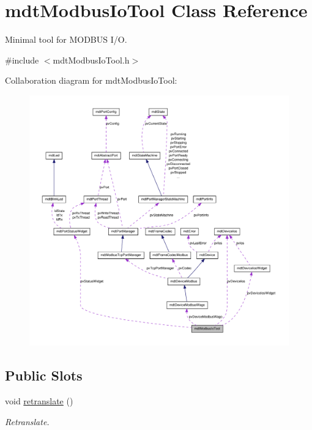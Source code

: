 \hypertarget{classmdt_modbus_io_tool}{
\section{mdtModbusIoTool Class Reference}
\label{classmdt_modbus_io_tool}
}


Minimal tool for MODBUS I/O.  




{\ttfamily \#include $<$mdtModbusIoTool.h$>$}



Collaboration diagram for mdtModbusIoTool:
\nopagebreak
\begin{figure}[H]
\begin{center}
\leavevmode
\includegraphics[width=400pt]{classmdt_modbus_io_tool__coll__graph}
\end{center}
\end{figure}
\subsection*{Public Slots}
\begin{DoxyCompactItemize}
\item 
void \hyperlink{classmdt_modbus_io_tool_a5e0ccfb8e352242fffc3f65f442f4d2f}{retranslate} ()
\begin{DoxyCompactList}\small\item\em Retranslate. \end{DoxyCompactList}\end{DoxyCompactItemize}
